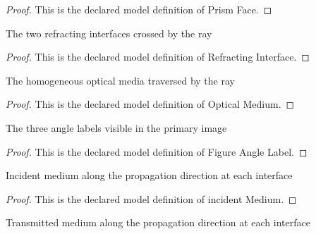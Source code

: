 \begin{proof}
  This is the declared model definition of Prism Face.
\end{proof}
\begin{definition}
  \label{def:physics:phyx-mini-0074:phyxminiproblems-problemphyxmini0074-refractinginterface}
  The two refracting interfaces crossed by the ray
\end{definition}
\begin{proof}
  This is the declared model definition of Refracting Interface.
\end{proof}
\begin{definition}
  \label{def:physics:phyx-mini-0074:phyxminiproblems-problemphyxmini0074-opticalmedium}
  The homogeneous optical media traversed by the ray
\end{definition}
\begin{proof}
  This is the declared model definition of Optical Medium.
\end{proof}
\begin{definition}
  \label{def:physics:phyx-mini-0074:phyxminiproblems-problemphyxmini0074-figureanglelabel}
  The three angle labels visible in the primary image
\end{definition}
\begin{proof}
  This is the declared model definition of Figure Angle Label.
\end{proof}
\begin{definition}
  \label{def:physics:phyx-mini-0074:phyxminiproblems-problemphyxmini0074-incidentmedium}
  Incident medium along the propagation direction at each interface
\end{definition}
\begin{proof}
  This is the declared model definition of incident Medium.
\end{proof}
\begin{definition}
  \label{def:physics:phyx-mini-0074:phyxminiproblems-problemphyxmini0074-transmittedmedium}
  Transmitted medium along the propagation direction at each interface
\end{definition}

